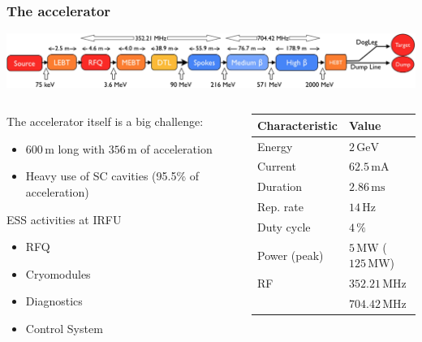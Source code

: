 \begin{frame}
  \frametitle{The accelerator}
  \includegraphics[width=\textwidth]{01_Neutron/fig/fig000_ESS_acc}
  \vfill
  \begin{columns}
    \begin{column}{0.45\textwidth}
      The accelerator itself is a big challenge:
        \begin{itemize}
          \item $600\,\mathrm{m}$ long with $356\,\mathrm{m}$ of acceleration
          \item Heavy use of SC cavities (95.5\% of acceleration)
        \end{itemize}
        \begin{block}{ESS activities at IRFU}
          \begin{itemize}
            \item RFQ
            \item Cryomodules
            \item Diagnostics
            \item Control System
          \end{itemize}
        \end{block}
    \end{column}
    \begin{column}{0.50\textwidth}
      \begin{tabularx}{\linewidth}{XX}
        \toprule
        Characteristic & Value                                 \\
        \midrule
        Energy         & $2\,\mathrm{GeV}$                     \\
        Current        & $62.5\,\mathrm{mA}$                   \\
        Duration       & $2.86\,\mathrm{ms}$                   \\
        Rep. rate      & $14\,\mathrm{Hz}$                     \\
        Duty cycle     & $4\,\mathrm{\%}$                      \\
        Power (peak)   & $5\,\mathrm{MW}$ ($125\,\mathrm{MW}$) \\
        RF             & $352.21\,\mathrm{MHz}$                \\
                       & $704.42\,\mathrm{MHz}$                \\
        \bottomrule
      \end{tabularx}
    \end{column}
  \end{columns}
\end{frame}